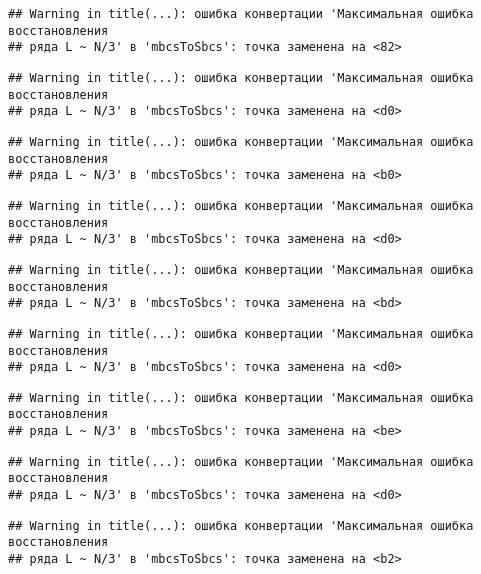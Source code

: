 \documentclass[
]{article}
\begin{document}
\begin{verbatim}
## Warning in title(...): ошибка конвертации 'Максимальная ошибка восстановления
## ряда L ~ N/3' в 'mbcsToSbcs': точка заменена на <82>
\end{verbatim}

\begin{verbatim}
## Warning in title(...): ошибка конвертации 'Максимальная ошибка восстановления
## ряда L ~ N/3' в 'mbcsToSbcs': точка заменена на <d0>
\end{verbatim}

\begin{verbatim}
## Warning in title(...): ошибка конвертации 'Максимальная ошибка восстановления
## ряда L ~ N/3' в 'mbcsToSbcs': точка заменена на <b0>
\end{verbatim}

\begin{verbatim}
## Warning in title(...): ошибка конвертации 'Максимальная ошибка восстановления
## ряда L ~ N/3' в 'mbcsToSbcs': точка заменена на <d0>
\end{verbatim}

\begin{verbatim}
## Warning in title(...): ошибка конвертации 'Максимальная ошибка восстановления
## ряда L ~ N/3' в 'mbcsToSbcs': точка заменена на <bd>
\end{verbatim}

\begin{verbatim}
## Warning in title(...): ошибка конвертации 'Максимальная ошибка восстановления
## ряда L ~ N/3' в 'mbcsToSbcs': точка заменена на <d0>
\end{verbatim}

\begin{verbatim}
## Warning in title(...): ошибка конвертации 'Максимальная ошибка восстановления
## ряда L ~ N/3' в 'mbcsToSbcs': точка заменена на <be>
\end{verbatim}

\begin{verbatim}
## Warning in title(...): ошибка конвертации 'Максимальная ошибка восстановления
## ряда L ~ N/3' в 'mbcsToSbcs': точка заменена на <d0>
\end{verbatim}

\begin{verbatim}
## Warning in title(...): ошибка конвертации 'Максимальная ошибка восстановления
## ряда L ~ N/3' в 'mbcsToSbcs': точка заменена на <b2>
\end{verbatim}
\end{document}
